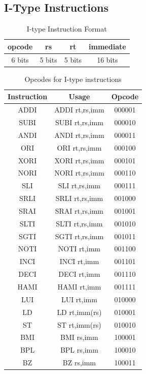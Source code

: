 \documentclass{article}
\begin{document}
\subsection{I-Type Instructions}
\begin{table}[H]
    \centering
    \begin{tabular}{|c|c|c|c|}
        \hline
        \textbf{opcode} & \textbf{rs} & \textbf{rt} & \textbf{immediate} \\
        \hline
        6 bits & 5 bits & 5 bits & 16 bits \\
        \hline
    \end{tabular}
    \caption{I-type Instruction Format}
\end{table}

\begin{table}[H]
    \centering
    \begin{tabular}{|c|c|c|}
        \hline
        \textbf{Instruction}  & \textbf{Usage} & \textbf{Opcode} \\
        \hline
        ADDI  & ADDI rt,rs,imm & 000001 \\
        SUBI  & SUBI rt,rs,imm & 000010 \\
        ANDI  & ANDI rt,rs,imm & 000011 \\
        ORI   & ORI rt,rs,imm & 000100 \\
        XORI  & XORI rt,rs,imm & 000101 \\
        NORI  & NORI rt,rs,imm & 000110 \\
        SLI & SLI rt,rs,imm & 000111 \\
        SRLI & SRLI rt,rs,imm & 001000 \\
        SRAI & SRAI rt,rs,imm & 001001 \\
        SLTI  & SLTI rt,rs,imm & 001010 \\
        SGTI  & SGTI rt,rs,imm & 001011 \\
        NOTI & NOTI rt,imm & 001100 \\
        INCI & INCI rt,imm & 001101 \\
        DECI & DECI rt,imm & 001110 \\
        HAMI & HAMI rt,imm & 001111 \\
        LUI  & LUI rt,imm & 010000 \\
        LD  & LD rt,imm(rs) & 010001 \\
        ST  & ST rt,imm(rs) & 010010 \\
        BMI  & BMI rs,imm & 100001 \\
        BPL  & BPL rs,imm & 100010 \\
        BZ   & BZ rs,imm & 100011 \\
        \hline
    \end{tabular}
    \caption{Opcodes for I-type instructions}
\end{table}
\end{document}
